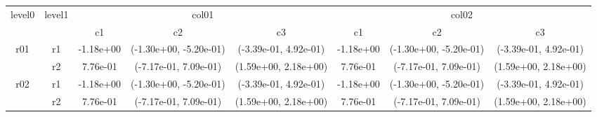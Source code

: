 \begin{tabular}{cccccccc}
\toprule
\multirow{2}{*}{level0} & \multirow{2}{*}{level1}&\multicolumn{3}{c}{col01}&\multicolumn{3}{c}{col02}\tabularnewline
\cmidrule(lr){3-5}
\cmidrule(lr){6-8}
&&c1&c2&c3&c1&c2&c3\tabularnewline
\midrule
\midrule
\multirow{2}{*}{r01}&r1&-1.18e+00& (-1.30e+00, -5.20e-01)& (-3.39e-01, 4.92e-01)&-1.18e+00& (-1.30e+00, -5.20e-01)& (-3.39e-01, 4.92e-01)\tabularnewline
&r2&7.76e-01& (-7.17e-01, 7.09e-01)& (1.59e+00, 2.18e+00)&7.76e-01& (-7.17e-01, 7.09e-01)& (1.59e+00, 2.18e+00)\tabularnewline
\midrule
\multirow{2}{*}{r02}&r1&-1.18e+00& (-1.30e+00, -5.20e-01)& (-3.39e-01, 4.92e-01)&-1.18e+00& (-1.30e+00, -5.20e-01)& (-3.39e-01, 4.92e-01)\tabularnewline
&r2&7.76e-01& (-7.17e-01, 7.09e-01)& (1.59e+00, 2.18e+00)&7.76e-01& (-7.17e-01, 7.09e-01)& (1.59e+00, 2.18e+00)\tabularnewline
\bottomrule
\end{tabular}
